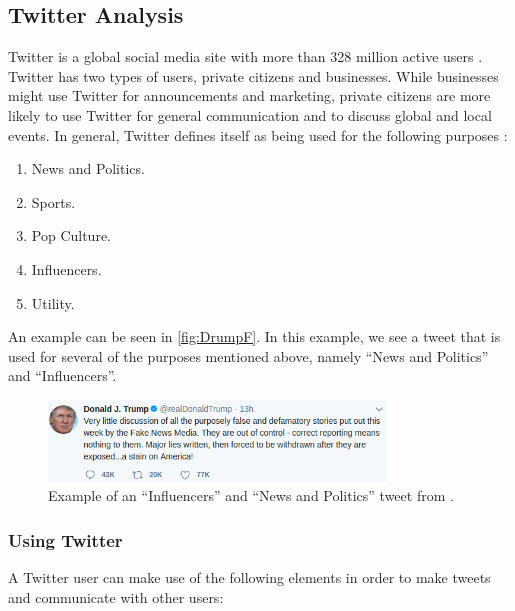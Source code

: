 \subsection{Twitter Analysis}\label{sec:twitter-analysis}
Twitter is a global social media site with more than 328 million active users
\citep{SocialMediaStats}. Twitter has two types of users, private citizens
and businesses. While businesses might use Twitter for announcements and
marketing, private citizens are more likely to use Twitter for general
communication and to discuss global and local events. In general, Twitter
defines itself as being used for the following purposes \citep{StartingTwitter}:

\begin{enumerate}    
  \item News and Politics.
  \item Sports.
  \item Pop Culture. 
  \item Influencers.
  \item Utility.
\end{enumerate} 

An example can be seen in \autoref{fig:DrumpF}. In this example, we see a tweet
that is used for several of the purposes mentioned above, namely ``News and
Politics'' and ``Influencers''.

\begin{figure}[H] 
	\centering 
	\includegraphics[width = 0.8\textwidth]{figures/DonDrumpf.png}
	\caption{Example of an ``Influencers'' and ``News and Politics'' tweet from
	\@realDonaldTrump.}
	\label{fig:DrumpF}
\end{figure}

\subsubsection{Using Twitter}
A Twitter user can make use of the following elements \citep{StartingTwitter}
in order to make tweets and communicate with other users:

